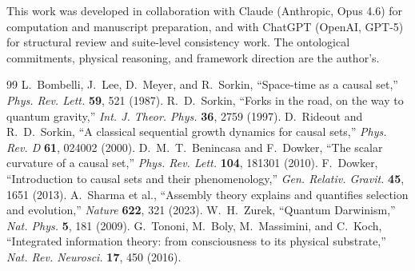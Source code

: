\documentclass[11pt]{article}
\begin{document}
This work was developed in collaboration with Claude (Anthropic, Opus 4.6) for computation and manuscript preparation, and with ChatGPT (OpenAI, GPT-5) for structural review and suite-level consistency work. The ontological commitments, physical reasoning, and framework direction are the author's.

\begin{thebibliography}{99}
 L.~Bombelli, J.~Lee, D.~Meyer, and R.~Sorkin, ``Space-time as a causal set,'' \emph{Phys. Rev. Lett.} \textbf{59}, 521 (1987).
 R.~D.~Sorkin, ``Forks in the road, on the way to quantum gravity,'' \emph{Int. J. Theor. Phys.} \textbf{36}, 2759 (1997).
 D.~Rideout and R.~D.~Sorkin, ``A classical sequential growth dynamics for causal sets,'' \emph{Phys. Rev. D} \textbf{61}, 024002 (2000).
 D.~M.~T.~Benincasa and F.~Dowker, ``The scalar curvature of a causal set,'' \emph{Phys. Rev. Lett.} \textbf{104}, 181301 (2010).
 F.~Dowker, ``Introduction to causal sets and their phenomenology,'' \emph{Gen. Relativ. Gravit.} \textbf{45}, 1651 (2013).
 A.~Sharma et al., ``Assembly theory explains and quantifies selection and evolution,'' \emph{Nature} \textbf{622}, 321 (2023).
 W.~H.~Zurek, ``Quantum Darwinism,'' \emph{Nat. Phys.} \textbf{5}, 181 (2009).
 G.~Tononi, M.~Boly, M.~Massimini, and C.~Koch, ``Integrated information theory: from consciousness to its physical substrate,'' \emph{Nat. Rev. Neurosci.} \textbf{17}, 450 (2016).
\end{thebibliography}
\end{document}
